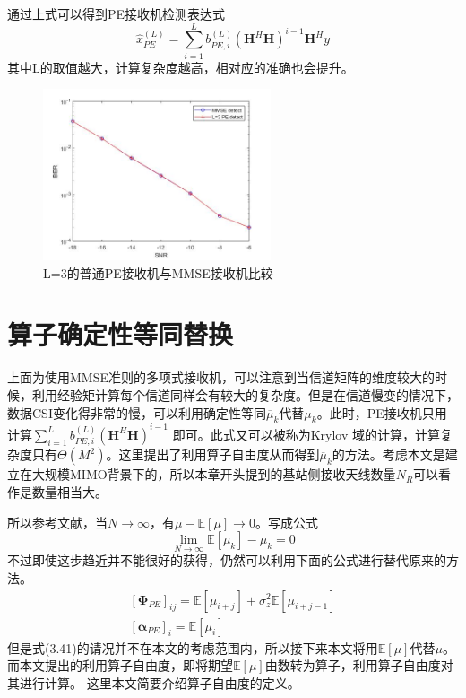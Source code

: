 \documentclass[bachelor,nocolorlinks, printoneside]{seuthesis} %
\begin{document}
\begin{Main}
通过上式可以得到PE接收机检测表达式
\begin{equation}\label{key}
\hat{x}_{PE}^{(L)} = \sum_{i=1}^{L}b_{PE,i}^{(L)}(\mathbf{H}^H\mathbf{H})^{i-1}  \mathbf{H}^H y
\end{equation}
其中L的取值越大，计算复杂度越高，相对应的准确也会提升。
\begin{figure}[htbp!]
	\centering \includegraphics[width=0.6\textwidth]{img/3_2.jpg} \caption{L=3的普通PE接收机与MMSE接收机比较}
\end{figure}

\section{算子确定性等同替换}
上面为使用MMSE准则的多项式接收机，可以注意到当信道矩阵的维度较大的时候，利用经验矩计算每个信道同样会有较大的复杂度。但是在信道慢变的情况下，数据CSI变化得非常的慢，可以利用确定性等同$\overline{\mu}_k$代替$\mu_k$。此时，PE接收机只用计算$\sum_{i=1}^{L} b_{PE,i}^{(L)}(\mathbf{H}^H\mathbf{H})^{i-1}$ 即可。此式又可以被称为Krylov 域的计算，计算复杂度只有$\Theta(M^2)$。这里提出了利用算子自由度从而得到$\overline{\mu}_k$的方法。考虑本文是建立在大规模MIMO背景下的，所以本章开头提到的基站侧接收天线数量$N_R$可以看作是数量相当大。

所以参考文献，当$N \rightarrow \infty$，有$\mu - \mathbb{E}[\mu] \rightarrow 0$。写成公式
\begin{equation}\label{key}
\lim_{N \rightarrow \infty} \mathbb{E}[\mu_k] -\mu_k =0
\end{equation}
不过即使这步趋近并不能很好的获得，仍然可以利用下面的公式进行替代原来的方法。
\begin{gather}\label{key}
[\mathbf{\Phi}_{PE}]_{ij} = \mathbb{E}[\mu_{i+j}] + \sigma_{z}^2 \mathbb{E}[\mu_{i+j-1}] \nonumber \\
\left[\mathbf{\alpha}_{PE}\right]_i = \mathbb{E}[\mu_i]
\end{gather}
但是式(3.41)的请况并不在本文的考虑范围内，所以接下来本文将用$\mathbb{E}[\mu]$代替$\mu$。而本文提出的利用算子自由度，即将期望$\mathbb{E}[\mu]$由数转为算子，利用算子自由度对其进行计算。
这里本文简要介绍算子自由度的定义。


\end{Main}
\end{document}
